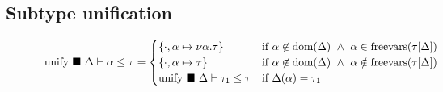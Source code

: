 \documentclass[manuscript]{acmart}
\begin{document}
\subsection{Subtype unification}

\begin{figure*}[h]
  \[
    \begin{array}{l @{} l}

      \text{unify } \blacksquare\ \Delta \vdash \alpha \leq \tau	
      &{} =
      \begin{cases}  
        \{ \cdot,\alpha \mapsto \nu\alpha.\tau \}
        & \text{if } 
        \alpha \not\in \text{dom}(\Delta) \ \wedge\
        \alpha \in \text{freevars}(\tau[\Delta])
        \\
        \{ \cdot,\alpha \mapsto \tau \}
        & \text{if } 
        \alpha \not\in \text{dom}(\Delta) \ \wedge\
        \alpha \notin \text{freevars}(\tau[\Delta])
        \\
        \text{unify } \blacksquare\ \Delta \vdash \tau_1 \leq \tau
        &\text{if }
        \Delta(\alpha) = \tau_1
      \end{cases}
      \\


\end{array}\]
\end{figure*}
\end{document}
